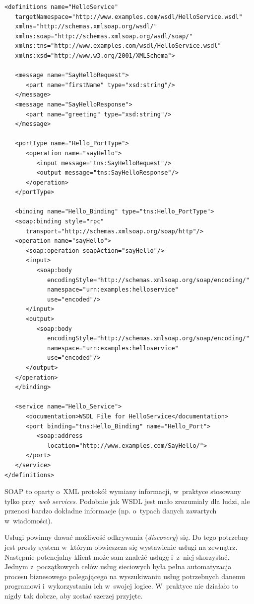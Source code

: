 \lstset{basicstyle=\footnotesize}
\begin{lstlisting}[float, frame=single, caption={Opis WSDL usługi posiadającej jedną metodę, \texttt{sayHello}, która zwraca tekst ,,Hello, world!''. Źródło:~\cite{wsdl-example}}, label=kod:wsdl-example]
<definitions name="HelloService"
   targetNamespace="http://www.examples.com/wsdl/HelloService.wsdl"
   xmlns="http://schemas.xmlsoap.org/wsdl/"
   xmlns:soap="http://schemas.xmlsoap.org/wsdl/soap/"
   xmlns:tns="http://www.examples.com/wsdl/HelloService.wsdl"
   xmlns:xsd="http://www.w3.org/2001/XMLSchema">
 
   <message name="SayHelloRequest">
      <part name="firstName" type="xsd:string"/>
   </message>
   <message name="SayHelloResponse">
      <part name="greeting" type="xsd:string"/>
   </message>

   <portType name="Hello_PortType">
      <operation name="sayHello">
         <input message="tns:SayHelloRequest"/>
         <output message="tns:SayHelloResponse"/>
      </operation>
   </portType>

   <binding name="Hello_Binding" type="tns:Hello_PortType">
   <soap:binding style="rpc"
      transport="http://schemas.xmlsoap.org/soap/http"/>
   <operation name="sayHello">
      <soap:operation soapAction="sayHello"/>
      <input>
         <soap:body
            encodingStyle="http://schemas.xmlsoap.org/soap/encoding/"
            namespace="urn:examples:helloservice"
            use="encoded"/>
      </input>
      <output>
         <soap:body
            encodingStyle="http://schemas.xmlsoap.org/soap/encoding/"
            namespace="urn:examples:helloservice"
            use="encoded"/>
      </output>
   </operation>
   </binding>

   <service name="Hello_Service">
      <documentation>WSDL File for HelloService</documentation>
      <port binding="tns:Hello_Binding" name="Hello_Port">
         <soap:address
            location="http://www.examples.com/SayHello/">
      </port>
   </service>
</definitions>
\end{lstlisting}
\lstset{basicstyle=\normalsize}

SOAP to oparty o~XML protokół wymiany informacji, w~praktyce stosowany tylko przy~\emph{web services}. Podobnie jak WSDL jest mało zrozumiały dla ludzi, ale przenosi bardzo dokładne informacje (np. o~typach danych zawartych w~wiadomości).

Usługi powinny dawać możliwość odkrywania (\emph{discovery}) się.
Do tego potrzebny jest prosty system w~którym obwieszcza się wystawienie usługi na zewnątrz.
Następnie potencjalny klient może sam znaleźć usługę i~z~niej skorzystać.
Jednym z~początkowych celów usług sieciowych była pełna automatyzacja procesu biznesowego polegającego na wyszukiwaniu usług potrzebnych danemu programowi i~wykorzystaniu ich w~swojej logice. W~praktyce nie działało to nigdy tak dobrze, aby zostać szerzej przyjęte. 

